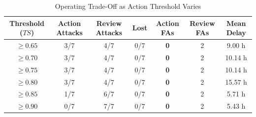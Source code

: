 \begin{table}[htbp]
\centering
\caption{Operating Trade-Off as Action Threshold Varies}
\label{tab:operating_tradeoff}
\begin{tabular}{ccccccc}
\toprule
Threshold ($TS$) & Action Attacks & Review Attacks & Lost & Action FAs & Review FAs & Mean Delay \\
\midrule
$\ge 0.65$ & 3/7 & 4/7 & 0/7 & \textbf{0} & 2 & 9.00 h \\
$\ge 0.70$ & 3/7 & 4/7 & 0/7 & \textbf{0} & 2 & 10.14 h \\
$\ge 0.75$ & 3/7 & 4/7 & 0/7 & \textbf{0} & 2 & 10.14 h \\
$\ge 0.80$ & 3/7 & 4/7 & 0/7 & \textbf{0} & 2 & 15.57 h \\
$\ge 0.85$ & 1/7 & 6/7 & 0/7 & \textbf{0} & 2 & 5.71 h \\
$\ge 0.90$ & 0/7 & 7/7 & 0/7 & \textbf{0} & 2 & 5.43 h \\
\bottomrule
\end{tabular}
\end{table}

